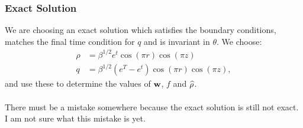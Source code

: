 \subsubsection{Exact Solution}
We are choosing an exact solution which satisfies the boundary conditions, matches the final time condition for $q$ and is invariant in $\theta$. We choose:
\begin{align*}
	\rho &= \beta^{1/2} e^t \cos(\pi r) \cos (\pi z)\\
	q &= \beta^{1/2}(e^T - e^t)\cos(\pi r)\cos(\pi z),
\end{align*}
and use these to determine the values of $\mathbf{w}$, $f$ and $\widehat \rho$.
\\
\\
There must be a mistake somewhere because the exact solution is still not exact. I am not sure what this mistake is yet.